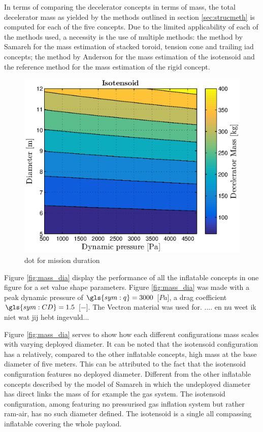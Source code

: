 In terms of comparing the decelerator concepts in terms of mass, the total decelerator mass as yielded by the methods outlined in section \ref{sec:strucmeth} is computed for each of the five concepts. Due to the limited applicability of each of the methods used, a necessity is the use of multiple methods: the method by Samareh \cite{Samareh2011} for the mass estimation of stacked toroid, tension cone and trailing \gls{iad} concepts; the method by Anderson \cite{Anderson1969} for the mass estimation of the isotensoid and the reference method for the mass estimation of the rigid concept. 

\begin{figure}[H]
\centering
\includegraphics[width = 1.0\textwidth]{Figure/ISO_comp.eps}
\caption{\acrlong{dot} for mission duration}
\label{fig:ISO_comp}
\end{figure}





Figure \ref{fig:mass_dia} display the performance of all the inflatable concepts in one figure for a set value shape parameters. Figure \ref{fig:mass_dia} was made with a peak dynamic pressure of $\gls{sym:q}=3000$ [$Pa$], a drag coefficient $\gls{sym:CD}=1.5$ [$-$]. The Vectron material was used for.  .... en nu weet ik  niet wat jij hebt ingevuld...

Figure \ref{fig:mass_dia} serves to show how each different configurations mass scales with varying deployed diameter. It can be noted that the isotensoid configuration has a relatively, compared to the other inflatable concepts, high mass at the base diameter of five meters. This can be attributed to the fact that the isotensoid configuration features no deployed diameter. Different from the other inflatable concepts described by the model of Samareh in which the undeployed diameter has direct links the mass of for example the gas system. The isotensoid configuration, among featuring no pressurised gas inflation system but rather ram-air, has no such diameter defined. The isotensoid is a single all compassing inflatable covering the whole payload.   

